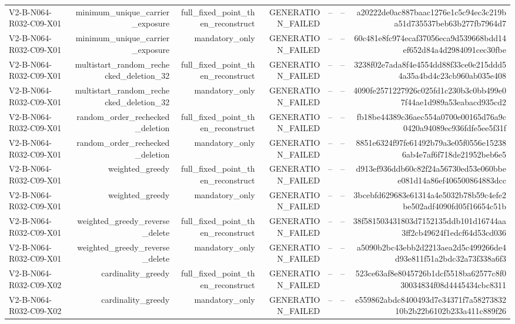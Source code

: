 {\begin{longtable}{lrrrrrr}
V2-B-N064-R032-C09-X01 & minimum\_unique\_carrier\_exposure & full\_fixed\_point\_then\_reconstruct & GENERATION\_FAILED & -- & -- & a20222de0ac887baac1276e1c5c94ec3c219ba51d735537beb63b277fb7964d7 \\
V2-B-N064-R032-C09-X01 & minimum\_unique\_carrier\_exposure & mandatory\_only & GENERATION\_FAILED & -- & -- & 60c481e8fc974ecaf37056eca9d539668bdd14ef652d84a4d2984091cec30fbe \\
V2-B-N064-R032-C09-X01 & multistart\_random\_rechecked\_deletion\_32 & full\_fixed\_point\_then\_reconstruct & GENERATION\_FAILED & -- & -- & 3238f02e7ada8f4e4554dd88f33ce0e215ddd54a35a4bd4c23cb960ab035e408 \\
V2-B-N064-R032-C09-X01 & multistart\_random\_rechecked\_deletion\_32 & mandatory\_only & GENERATION\_FAILED & -- & -- & 4090fe2571227926c025fd1c230b3c0bb499e07f44ae1d989a53eabacd935cd2 \\
V2-B-N064-R032-C09-X01 & random\_order\_rechecked\_deletion & full\_fixed\_point\_then\_reconstruct & GENERATION\_FAILED & -- & -- & fb18be44389c36aec554a0700e00165d76a9c0420a94089ec936fdfe5ee5f31f \\
V2-B-N064-R032-C09-X01 & random\_order\_rechecked\_deletion & mandatory\_only & GENERATION\_FAILED & -- & -- & 8851e6324f97fe61492b79a3e05f0556e152386ab4e7af6f718de21952beb6e5 \\
V2-B-N064-R032-C09-X01 & weighted\_greedy & full\_fixed\_point\_then\_reconstruct & GENERATION\_FAILED & -- & -- & d913ef936ddb60c82f24a56730ed53e060bbee081d14a86ef406500864883dcc \\
V2-B-N064-R032-C09-X01 & weighted\_greedy & mandatory\_only & GENERATION\_FAILED & -- & -- & 3bcebfd629683e61314a4e5032b78b59c4efe2be502adf4090fd05f16654c51b \\
V2-B-N064-R032-C09-X01 & weighted\_greedy\_reverse\_delete & full\_fixed\_point\_then\_reconstruct & GENERATION\_FAILED & -- & -- & 38f581503431803d7152135ddb101d16744aa3ff2cb49624f1edcf64d53cd036 \\
V2-B-N064-R032-C09-X01 & weighted\_greedy\_reverse\_delete & mandatory\_only & GENERATION\_FAILED & -- & -- & a5090b2bc43ebb2d2213aea2d5c499266de4d93e811f51a2bdc32a73f338a6f3 \\
V2-B-N064-R032-C09-X02 & cardinality\_greedy & full\_fixed\_point\_then\_reconstruct & GENERATION\_FAILED & -- & -- & 523ce63af8e8045726b1dcf5518ba62577c8f030034834f08d4445434cbc8311 \\
V2-B-N064-R032-C09-X02 & cardinality\_greedy & mandatory\_only & GENERATION\_FAILED & -- & -- & e559862abdc8400493d7e34371f7a5827383210b2b22b6102b233a411c889f26 \\

\end{longtable}}
